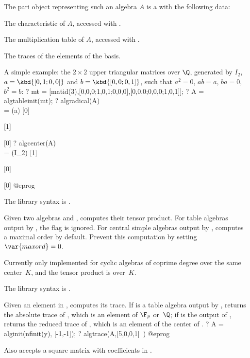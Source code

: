 The pari object representing such an algebra $A$ is a  with the
following data:

 \item The characteristic of $A$, accessed with .

 \item The multiplication table of $A$, accessed with .

 \item The traces of the elements of the basis.

A simple example: the $2\times 2$ upper triangular matrices over $\Q$,
generated by $I_2$, $a = \kbd{[0,1;0,0]}$ and $b = \kbd{[0,0;0,1]}$,
such that $a^2 = 0$, $ab = a$, $ba = 0$, $b^2 = b$:
\bprog
? mt = [matid(3),[0,0,0;1,0,1;0,0,0],[0,0,0;0,0,0;1,0,1]];
? A = algtableinit(mt);
? algradical(A) \\ = (a)
[0]

[1]

[0]
? algcenter(A) \\ = (I_2)
[1]

[0]

[0]
@eprog

The library syntax is .

\label{se:algtensor}
Given two algebras  and , computes their tensor
product. For table algebras output by , the flag
 is ignored. For central simple algebras output by ,
computes a maximal order by default. Prevent this computation by setting
$\var{maxord}=0$.

Currently only implemented for cyclic algebras of coprime degree over the same
center~$K$, and the tensor product is over~$K$.

The library syntax is .

\label{se:algtrace}
Given an element  in , computes its trace. If  is
a table algebra output by , returns the absolute trace of
, which is an element of $\F_p$ or~$\Q$; if  is the output of
, returns the reduced trace of , which is an element of
the center of .
\bprog
? A = alginit(nfinit(y), [-1,-1]);
? algtrace(A,[5,0,0,1]~)
@eprog

Also accepts a square matrix with coefficients in .

